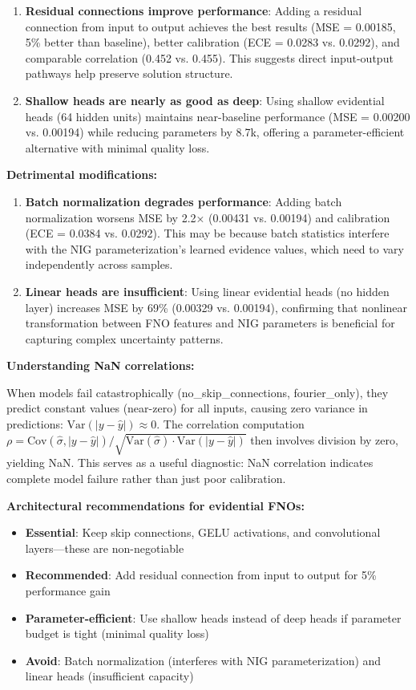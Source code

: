 \begin{enumerate}
\item \textbf{Residual connections improve performance}: Adding a residual connection from input to output achieves the best results (MSE = 0.00185, 5\% better than baseline), better calibration (ECE = 0.0283 vs. 0.0292), and comparable correlation (0.452 vs. 0.455). This suggests direct input-output pathways help preserve solution structure.

\item \textbf{Shallow heads are nearly as good as deep}: Using shallow evidential heads (64 hidden units) maintains near-baseline performance (MSE = 0.00200 vs. 0.00194) while reducing parameters by 8.7k, offering a parameter-efficient alternative with minimal quality loss.
\end{enumerate}

\textbf{Detrimental modifications:}

\begin{enumerate}
\item \textbf{Batch normalization degrades performance}: Adding batch normalization worsens MSE by 2.2× (0.00431 vs. 0.00194) and calibration (ECE = 0.0384 vs. 0.0292). This may be because batch statistics interfere with the NIG parameterization's learned evidence values, which need to vary independently across samples.

\item \textbf{Linear heads are insufficient}: Using linear evidential heads (no hidden layer) increases MSE by 69\% (0.00329 vs. 0.00194), confirming that nonlinear transformation between FNO features and NIG parameters is beneficial for capturing complex uncertainty patterns.
\end{enumerate}

\textbf{Understanding NaN correlations:}

When models fail catastrophically (no\_skip\_connections, fourier\_only), they predict constant values (near-zero) for all inputs, causing zero variance in predictions: $\text{Var}(|y - \hat{y}|) \approx 0$. The correlation computation $\rho = \text{Cov}(\hat{\sigma}, |y - \hat{y}|) / \sqrt{\text{Var}(\hat{\sigma}) \cdot \text{Var}(|y - \hat{y}|)}$ then involves division by zero, yielding NaN. This serves as a useful diagnostic: NaN correlation indicates complete model failure rather than just poor calibration.

\textbf{Architectural recommendations for evidential FNOs:}

\begin{itemize}
\item \textbf{Essential}: Keep skip connections, GELU activations, and convolutional layers—these are non-negotiable
\item \textbf{Recommended}: Add residual connection from input to output for 5\% performance gain
\item \textbf{Parameter-efficient}: Use shallow heads instead of deep heads if parameter budget is tight (minimal quality loss)
\item \textbf{Avoid}: Batch normalization (interferes with NIG parameterization) and linear heads (insufficient capacity)
\end{itemize}

